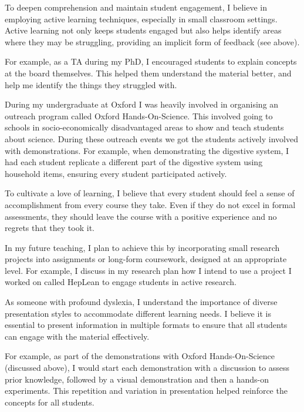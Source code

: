 \documentclass[12pt,letter]{article}
\newcounter{customtitle}
\begin{document}
To deepen comprehension and maintain student engagement, I believe in employing active learning techniques, especially in small classroom settings. Active learning not only keeps students engaged but also helps identify areas where they may be struggling, providing an implicit form of feedback (see above).

For example, as a TA during my PhD, I encouraged students to explain concepts at the board themselves. This helped them understand the material better, and help me identify the things they struggled with. 

During my undergraduate at Oxford I was heavily involved in organising an outreach program called Oxford Hands-On-Science. This involved going to schools in socio-economically  disadvantaged areas to show and teach students about science. During these outreach events we got the students actively involved with demonstrations. For example, when demonstrating the digestive system,  I had each student replicate a different part of the digestive system using household items, ensuring every student participated actively.

  
To cultivate a love of learning, I believe that every student should feel a sense of accomplishment from every course they take. Even if they do not excel in formal assessments, they should leave the course with a positive experience and no regrets that they took it.


In my future teaching, I plan to achieve this by incorporating small research projects into assignments or long-form coursework, designed at an appropriate level. For example, I discuss in my research plan how I intend to use a project I worked on called HepLean to engage students in active research.

 As someone with profound dyslexia, I understand the importance of diverse presentation styles to accommodate different learning needs. I believe it is essential to present information in multiple formats to ensure that all students can engage with the material effectively.
 
 For example, as part of the demonstrations with Oxford Hands-On-Science (discussed above), I would start each demonstration with a discussion to assess prior knowledge, followed by a visual demonstration and then a hands-on experiments. This repetition and variation in presentation helped reinforce the concepts for all students.
   
\end{document}

